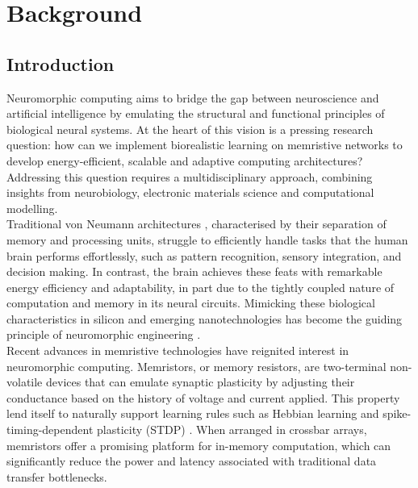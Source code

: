 
\chapter{Background}  %


\section[Introduction]{Introduction}

Neuromorphic computing aims to bridge the gap between neuroscience and artificial intelligence by emulating the structural and functional principles of biological neural systems. At the heart of this vision is a pressing research question: how can we implement biorealistic learning on memristive networks to develop energy-efficient, scalable and adaptive computing architectures? Addressing this question requires a multidisciplinary approach, combining insights from neurobiology, electronic materials science and computational modelling. \\

\noindent Traditional von Neumann architectures \cite{von1993first}, characterised by their separation of memory and processing units, struggle to efficiently handle tasks that the human brain performs effortlessly, such as pattern recognition, sensory integration, and decision making. In contrast, the brain achieves these feats with remarkable energy efficiency and adaptability, in part due to the tightly coupled nature of computation and memory in its neural circuits. Mimicking these biological characteristics in silicon and emerging nanotechnologies has become the guiding principle of neuromorphic engineering \cite{saighi2015plasticity}. \\

\noindent Recent advances in memristive technologies have reignited interest in neuromorphic computing. Memristors, or memory resistors, are two-terminal non-volatile devices that can emulate synaptic plasticity by adjusting their conductance based on the history of voltage and current applied. This property lend itself to naturally support learning rules such as Hebbian learning \cite{hebb2005organization} and spike-timing-dependent plasticity (STDP) \cite{markram1997regulation}. When arranged in crossbar arrays, memristors offer a promising platform for in-memory computation, which can significantly reduce the power and latency associated with traditional data transfer bottlenecks. \\

